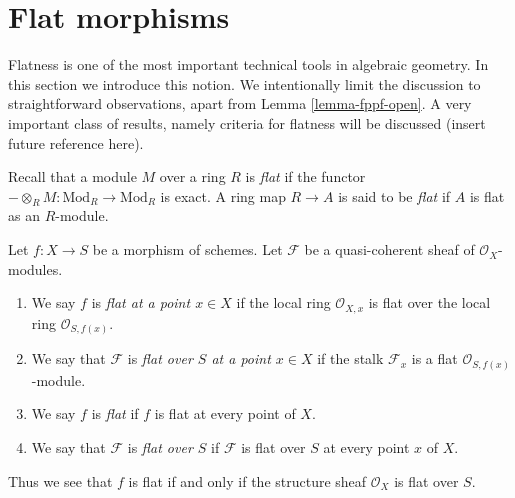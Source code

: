 \section{Flat morphisms}
\label{section-flat}

\noindent
Flatness is one of the most important technical tools in algebraic geometry.
In this section we introduce this notion. We intentionally limit the discussion
to straightforward observations, apart from Lemma \ref{lemma-fppf-open}.
A very important class of results, namely criteria for flatness will
be discussed (insert future reference here).

\medskip\noindent
Recall that a module $M$ over a ring $R$ is {\it flat} if the functor
$-\otimes_R M : \text{Mod}_R \to \text{Mod}_R$ is exact. A ring map
$R \to A$ is said to be {\it flat} if $A$ is flat as an $R$-module.

\begin{definition}
\label{definition-flat}
Let $f : X \to S$ be a morphism of schemes.
Let $\mathcal{F}$ be a quasi-coherent sheaf of $\mathcal{O}_X$-modules.
\begin{enumerate}
\item We say $f$ is {\it flat at a point $x \in X$} if the
local ring $\mathcal{O}_{X, x}$ is flat over the local ring
$\mathcal{O}_{S, f(x)}$.
\item We say that $\mathcal{F}$ is {\it flat over $S$ at a point $x \in X$}
if the stalk $\mathcal{F}_x$ is a flat $\mathcal{O}_{S, f(x)}$-module.
\item We say $f$ is {\it flat} if $f$ is flat at every point of $X$.
\item We say that $\mathcal{F}$ is {\it flat over $S$} if
$\mathcal{F}$ is flat over $S$ at every point $x$ of $X$.
\end{enumerate}
\end{definition}

\noindent
Thus we see that $f$ is flat if and only if
the structure sheaf $\mathcal{O}_X$ is flat over $S$.

